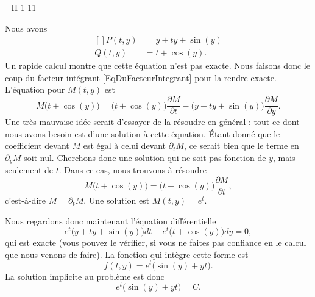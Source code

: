 \begin{corrige}{_II-1-11}
\begin{enumerate}
Nous avons
\begin{equation}
	\begin{aligned}[]
		P(t,y)	&=y+ty+\sin(y)\\
		Q(t,y)	&=t+\cos(y).
	\end{aligned}
\end{equation}
Un rapide calcul montre que cette équation n'est pas exacte. Nous faisons donc le coup du facteur intégrant \eqref{EqDuFacteurIntegrant} pour la rendre exacte. L'équation pour $M(t,y)$ est
\begin{equation}
	M\big( t+\cos(y) \big)=\big( t+\cos(y) \big)\frac{ \partial M }{ \partial t }-\big(y+ty+\sin(y)\big)\frac{ \partial M }{ \partial y }.
\end{equation}
Une très mauvaise idée serait d'essayer de la résoudre en général : tout ce dont nous avons besoin est d'une solution à cette équation. Étant donné que le coefficient devant $M$ est égal à celui devant $\partial_tM$, ce serait bien que le terme en $\partial_yM$ soit nul. Cherchons donc une solution qui ne soit pas fonction de $y$, mais seulement de $t$. Dans ce cas, nous trouvons à résoudre
\begin{equation}
	M\big( t+\cos(y) \big)=\big( t+\cos(y) \big)\frac{ \partial M }{ \partial t },
\end{equation}
c'est-à-dire $M=\partial_tM$. Une solution est $M(t,y)= e^{t}$.

Nous regardons donc maintenant l'équation différentielle
\begin{equation}
	e^t\big(y+ty+\sin(y)\big)dt+e^t\big(t+\cos(y)\big)dy=0,
\end{equation}
qui est exacte (vous pouvez le vérifier, si vous ne faites pas confiance en le calcul que nous venons de faire). La fonction qui intègre cette forme est
\begin{equation}
	f(t,y)=e^t\big( \sin(y)+yt \big).
\end{equation}
La solution implicite au problème est donc
\begin{equation}
	e^t\big( \sin(y)+yt \big)=C.
\end{equation}



\end{enumerate}


\end{corrige}
